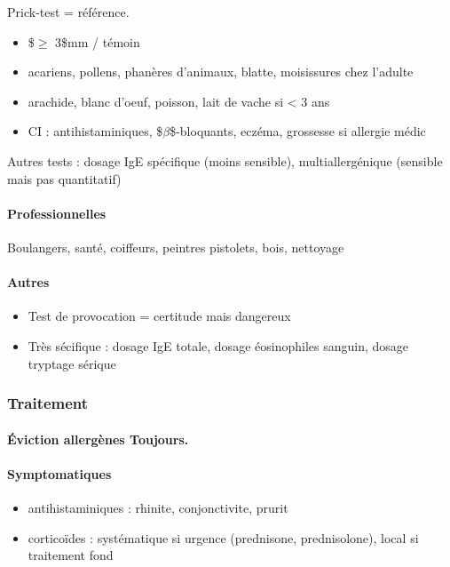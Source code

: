 \documentclass[11pt]{article}
\begin{document}
Prick-test = référence.

\begin{itemize}
\item \$\diameter \(\ge\) 3\$mm / témoin
\item acariens, pollens, phanères d'animaux, blatte, moisissures chez l'adulte
\item arachide, blanc d'oeuf, poisson, lait de vache si < 3 ans
\item CI : antihistaminiques, \$\(\beta\)\$-bloquants, eczéma, grossesse si
allergie médic
\end{itemize}


Autres tests : dosage IgE spécifique (moins sensible), multiallergénique (sensible mais
pas quantitatif)

\paragraph{Professionnelles}
\label{sec:org7fa3181}
Boulangers, santé, coiffeurs, peintres pistolets, bois, nettoyage

\paragraph{Autres}
\label{sec:orgdfe315b}
\begin{itemize}
\item Test de provocation = certitude mais dangereux
\item Très sécifique : dosage IgE totale, dosage éosinophiles sanguin, dosage tryptage sérique
\end{itemize}

\subsubsection{Traitement}
\label{sec:org432cb97}
\paragraph{Éviction allergènes Toujours.}
\label{sec:org09ef763}

\paragraph{Symptomatiques}
\label{sec:org4491574}

\begin{itemize}
\item antihistaminiques : rhinite, conjonctivite, prurit
\item corticoïdes : systématique si urgence (prednisone, prednisolone), local
si traitement fond
\end{itemize}
\end{document}
